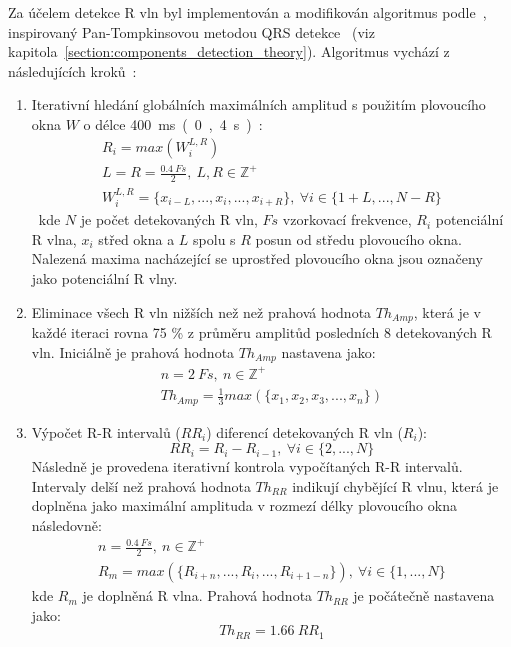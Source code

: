 Za účelem detekce R vln byl implementován a modifikován algoritmus
podle~\cite{Nabian2018}, inspirovaný Pan-Tompkinsovou metodou QRS
detekce~\cite{Pan1985} (viz kapitola~\ref{section:components_detection_theory}).
Algoritmus vychází z následujících kroků~\cite{Nabian2018}:
\begin{enumerate}
    \item Iterativní hledání globálních maximálních amplitud s použitím
          plovoucího okna $W$ o délce 400~\si\ms~(0,4~\si\s):
          \begin{gather}
              R_i = max(W_i^{L,R}) \nonumber \\
              L = R = \frac{0.4~Fs}{2}, ~L,R \in \mathbb{Z^+} \nonumber \\
              W_i^{L,R} = \{x_{i-L},...,x_i,...,x_{i+R}\}, ~\forall i \in \{1+L,...,N-R\}
          \end{gather}
          kde $N$ je počet detekovaných R vln, $Fs$ vzorkovací frekvence, $R_i$
          potenciální R vlna, $x_i$ střed okna a $L$ spolu s $R$ posun od středu
          plovoucího okna. Nalezená maxima nacházející se uprostřed plovoucího
          okna jsou označeny jako potenciální R vlny.
    \item Eliminace všech R vln nižších než než prahová hodnota $Th_{Amp}$, která je v
          každé iteraci rovna 75 \% z průměru amplitůd posledních 8 detekovaných
          R vln. Iniciálně je prahová hodnota $Th_{Amp}$ nastavena jako:
          \begin{gather}
              n = 2~Fs, ~n \in \mathbb{Z^+} \nonumber \\
              Th_{Amp} = \frac{1}{3} max(\{x_1,x_2,x_3,...,x_n\})
          \end{gather}
    \item Výpočet R-R intervalů ($RR_i$) diferencí detekovaných R vln ($R_i$):
          \begin{equation}
              RR_i = R_{i} - R_{i-1}, ~\forall i \in \{2,...,N\}
          \end{equation}
          Následně je provedena iterativní kontrola vypočítaných R-R intervalů.
          Intervaly delší než prahová hodnota $Th_{RR}$ indikují chybějící R
          vlnu, která je doplněna jako maximální amplituda v rozmezí délky
          plovoucího okna následovně:
          \begin{gather}
              n = \frac{0.4~Fs}{2}, ~n \in \mathbb{Z^+} \nonumber \\
              R_m = max(\{R_{i+n},...,R_i,...,R_{i+1-n}\}), ~\forall i \in \{1,...,N\}
          \end{gather}
          kde $R_m$ je doplněná R vlna. Prahová hodnota $Th_{RR}$ je počátečně
          nastavena jako:
          \begin{equation}
              Th_{RR} = 1.66~RR_1
          \end{equation}
\end{enumerate}

